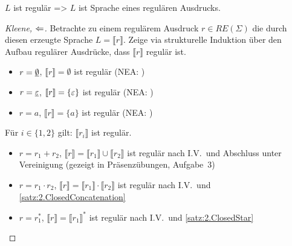     
\begin{Satz}[Kleene]\label{sat:2.kleene}
$L$ ist regulär \<=> $L$ ist Sprache eines regulären Ausdrucks.
\end{Satz}


\begin{proof}[Kleene, $\<=$]
Betrachte zu einem regulärem Ausdruck $r\in RE(\Sigma)$ die durch diesen erzeugte Sprache $L=\llbracket r \rrbracket$. 
Zeige via strukturelle Induktion über den Aufbau regulärer Ausdrücke, dass $ \llbracket r \rrbracket$ regulär ist.
    	\begin{description}[font=\normalfont]
      \item[I.A.:] \hfill
        \vspace{-1.45\baselineskip}
        \begin{itemize}
        \item $r = \underline{\smash{\emptyset}}$, $\llbracket r \rrbracket = \emptyset$ ist regulär
          (\acs{NEA}: 
    			)
        \item $r = \underline{\smash{\varepsilon}}$, $[\![ r ]\!] = \{ \varepsilon \}$ ist regulär
          (\acs{NEA}: 
    			)
        \item $r = a$, $\llbracket r \rrbracket = \{ a \}$ ist regulär
          (\acs{NEA}: 
    			) 
        \end{itemize}
        \item[I.V.:] Für $i \in \{1, 2\}$ gilt: $\llbracket r_i \rrbracket$ ist regulär.
    		\item[I.S.:] \hfill
          \vspace{-1.45\baselineskip}
          \begin{itemize}
          \item $r = r_1 + r_2$, $\llbracket r \rrbracket = \llbracket r_1 \rrbracket \cup \llbracket r_2 \rrbracket$ ist regulär nach I.V.\ und Abschluss unter Vereinigung (gezeigt in Präsenzübungen, Aufgabe~3)
          \item $r = r_1 \cdot r_2$, $\llbracket r \rrbracket = \llbracket r_1 \rrbracket \cdot \llbracket r_2 \rrbracket$ ist regulär nach I.V.\ und \autoref{satz:2.ClosedConcatenation}
          \item $r = r_1^*$, $\llbracket r \rrbracket = \llbracket r_1 \rrbracket^*$ ist regulär nach I.V.\ und \autoref{satz:2.ClosedStar}
          \qedhere
          \end{itemize}
		\end{description}
\end{proof}


